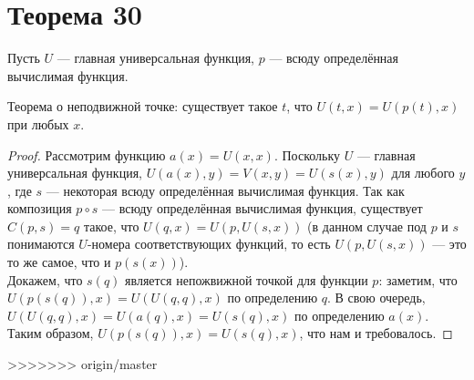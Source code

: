 \documentclass[a4paper,12pt]{article}
\begin{document}
	\section {Теорема 30}
	{
	\noindent
	Пусть $U$ --- главная универсальная функция, $p$ --- всюду определённая вычислимая функция.
	}
	\begin{theorem}
	Теорема о неподвижной точке: существует такое $t$, что $U(t, x)=U(p(t), x)$ при любых $x$.
	\end{theorem}
	\begin{proof}
	Рассмотрим функцию $a(x) = U(x, x)$. Поскольку $U$ --- главная универсальная функция, $U(a(x), y)=V(x, y)=U(s(x), y)$ для любого $y$, где $s$ --- некоторая всюду определённая вычислимая функция.
    Так как композиция $p \circ s$ --- всюду определённая вычислимая функция, существует $C(p, s) = q$ такое, что $U(q, x)=U(p, U(s, x))$ (в данном случае под $p$ и $s$ понимаются $U$-номера соответствующих функций, то есть $U(p, U(s, x))$ --- это то же самое, что и $p(s(x))$).\\
    Докажем, что $s(q)$ является непожвижной точкой для функции $p$: заметим, что $U(p(s(q)), x)=U(U(q, q), x)$ по определению $q$. В свою очередь, $U(U(q, q), x)=U(a(q), x)=U(s(q), x)$ по определению $a(x)$. Таким образом, $U(p(s(q)), x)=U(s(q), x)$, что нам и требовалось.
	\end{proof}
	
	
>>>>>>> origin/master
\end{document}
